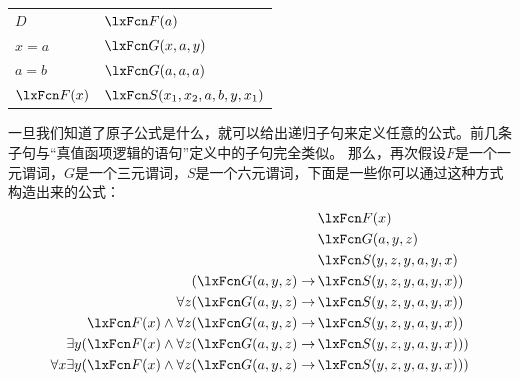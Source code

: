 \begin{center}
		\begin{tabular}{l@{\qquad\qquad}l}
		$D$ & $\atom{F}{a}$\\
		$x = a$ & $\atom{G}{x,a,y}$\\
		$a = b$ & $\atom{G}{a,a,a}$\\
		$\atom{F}{x}$ & $\atom{S}{x_1, x_2, a, b, y, x_1}$
	\end{tabular}
\end{center}


一旦我们知道了原子公式是什么，就可以给出递归子句来定义任意的公式。前几条子句与“真值函项逻辑的语句”定义中的子句完全类似。
那么，再次假设$F$是一个一元谓词，$G$是一个三元谓词，$S$是一个六元谓词，下面是一些你可以通过这种方式构造出来的公式：
	\begin{align*}
		& \atom{F}{x}\\
		& \atom{G}{a,y,z}\\
		& \atom{S}{y,z,y,a,y,x}\\
		(\atom{G}{a,y,z} \eif \,& \atom{S}{y,z,y,a,y,x})\\
		\forall z (\atom{G}{a,y,z} \eif \,& \atom{S}{y,z,y,a,y,x})\\
		\atom{F}{x} \eand \forall z (\atom{G}{a,y,z} \eif \,& \atom{S}{y,z,y,a,y,x})\\
		\exists y (\atom{F}{x} \eand \forall z (\atom{G}{a,y,z} \eif \,& \atom{S}{y,z,y,a,y,x}))\\
		\forall x \exists y (\atom{F}{x} \eand \forall z (\atom{G}{a,y,z} \eif \,& \atom{S}{y,z,y,a,y,x}))
	\end{align*}
